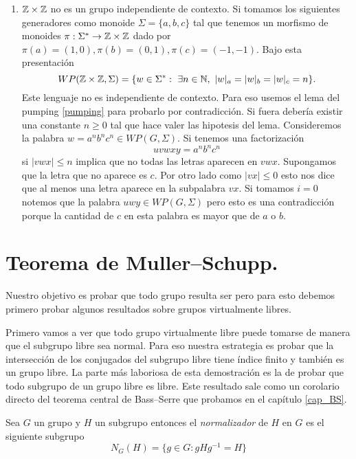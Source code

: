 \documentclass[tesis.tex]{subfiles}
\begin{document}
\begin{ej}
\begin{enumerate}[E1.]
		\item 	$\mathbb{Z} \times \mathbb{Z}$ no es un grupo independiente de contexto.
		Si tomamos los siguientes generadores como monoide $\Sigma = \{ a,b,c \}$ tal que tenemos un morfismo de monoides $\pi: \Sigma^* \to \mathbb{Z} \times \mathbb{Z}$ dado por $\pi(a)=(1,0), \pi(b)=(0,1), \pi(c)=(-1,-1)$.
		Bajo esta presentación 
		\[
		WP(\mathbb{Z} \times \mathbb{Z}, \Sigma) = \{ w \in \Sigma^*  : \ \exists n \in \mathbb{N}, \ |w|_a = |w|_b = |w|_c = n \}.
		\]
		Este lenguaje no es independiente de contexto.
		Para eso usemos el lema del pumping \ref{pumping} para probarlo por contradicción.
		Si fuera \ic debería existir una constante $n \ge 0$ tal que hace valer las hipotesis del lema.
		Consideremos la palabra $w = a^n b^n c^n \in WP(G, \Sigma)$.
		Si tenemos una factorización 
		\[
		uvwxy = a^nb^nc^n
		\]
		si $|vwx| \le n$ implica que no todas las letras aparecen en $vwx$.
		Supongamos que la letra que no aparece es $c$.
		Por otro lado como $|vx| \le 0$ esto nos dice que al menos una letra aparece en la subpalabra $vx$.
		Si tomamos $i=0$ notemos que la palabra $uwy \in WP(G,\Sigma)$ pero esto es una contradicción porque la cantidad de $c$ en esta palabra es mayor que de $a$ o $b$.
	\end{enumerate}
\end{ej}





\section{Teorema de Muller--Schupp.}\label{secc_teo_MS}

Nuestro objetivo es probar que todo grupo \vl resulta ser \ic pero para esto debemos primero probar algunos resultados sobre grupos virtualmente libres.

Primero vamos a ver que todo grupo virtualmente libre puede tomarse de manera que el subgrupo libre sea normal.
Para eso nuestra estrategia es probar que la intersección de los conjugados del subgrupo libre tiene índice finito y también es un grupo libre. 
La parte más laboriosa de esta demostración es la de probar que todo subgrupo de un grupo libre es libre.
Este resultado sale como un corolario directo del teorema central de Bass--Serre que probamos en el capítulo \ref{cap_BS}.
\begin{deff}
	Sea $G$ un grupo y $H$ un subgrupo entonces el \emph{normalizador} de $H$ en $G$ es el siguiente subgrupo
	\begin{equation*}
		N_G(H) = \{ g\in G : gHg^{-1} = H  \}
	\end{equation*}
\end{deff}
\end{document}
